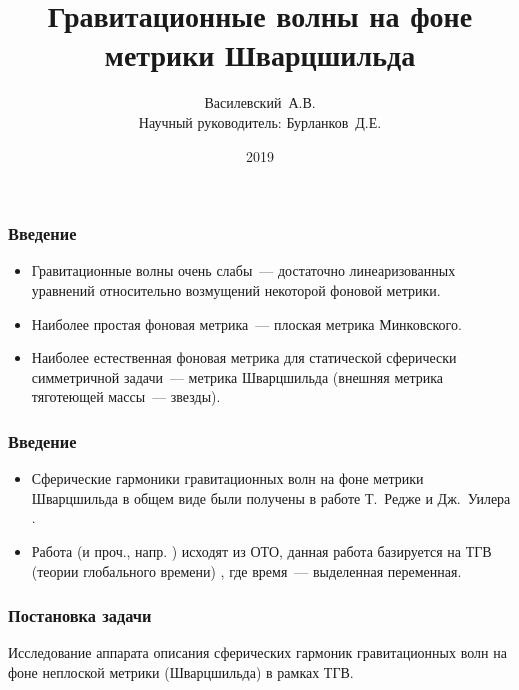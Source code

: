 \documentclass[compress]{beamer}
\title{Гравитационные волны на фоне метрики Шварцшильда}
\author[Василевский~А.В.]{
    Василевский~А.В. \\[\baselineskip]
    {\footnotesize Научный руководитель: Бурланков~Д.Е.}
}
\institute[ННГУ]{Нижегородский университет им. Н.И.~Лобачевского}
\date{2019}
\begin{document}
    \frame[plain]{\titlepage}

    \begin{frame}\frametitle{Введение}

        \begin{itemize}
            \item Гравитационные волны очень слабы~--- достаточно линеаризованных уравнений относительно возмущений некоторой фоновой метрики.
            \item Наиболее простая фоновая метрика~--- плоская метрика Минковского.
            \item Наиболее естественная фоновая метрика для статической сферически симметричной задачи~--- метрика Шварцшильда (внешняя метрика тяготеющей массы~--- звезды).
        \end{itemize}

    \end{frame}

    \begin{frame}\frametitle{Введение}

        \begin{itemize}
            \item Сферические гармоники гравитационных волн на фоне метрики Шварцшильда в общем виде были получены в работе Т.~Редже и Дж.~Уилера \cite{regge_wheeler_1957}.
            \item Работа \cite{regge_wheeler_1957} (и проч., напр. \cite{thorne_multipole}) исходят из ОТО, данная работа базируется на ТГВ (теории глобального времени) \cite{burlankov_space_dynamics}, где время~--- выделенная переменная.
        \end{itemize}

    \end{frame}

    \begin{frame}\frametitle{Постановка задачи}

        Исследование аппарата описания сферических гармоник гравитационных волн на фоне неплоской метрики (Шварцшильда) в рамках ТГВ.

    \end{frame}
\end{document}
